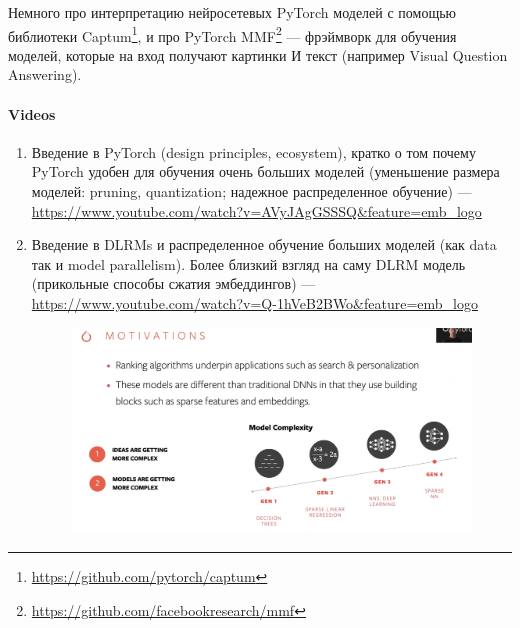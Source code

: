 Немного про интерпретацию нейросетевых PyTorch моделей с помощью библиотеки Captum\footnote{\url{https://github.com/pytorch/captum}}, и про PyTorch MMF\footnote{\url{https://github.com/facebookresearch/mmf}} --- фрэймворк для обучения моделей, которые на вход получают картинки И текст (например Visual Question Answering).  

\paragraph{Videos}

\begin{enumerate}
    \item Введение в PyTorch (design principles, ecosystem), кратко о том почему PyTorch удобен для обучения очень больших моделей (уменьшение размера моделей: pruning, quantization; надежное распределенное обучение) --- \url{https://www.youtube.com/watch?v=AVyJAgGSSSQ&feature=emb_logo} 
    \item Введение в DLRMs и распределенное обучение больших моделей (как data так и model parallelism). Более близкий взгляд на саму DLRM модель (прикольные способы сжатия эмбеддингов) --- \url{https://www.youtube.com/watch?v=Q-1hVeB2BWo&feature=emb_logo}
        \begin{figure}[ht]
            \centering
            \includegraphics[width=0.8\linewidth]{parts/recsys/images/dlrm.png}
        \end{figure}
        

\end{enumerate}
